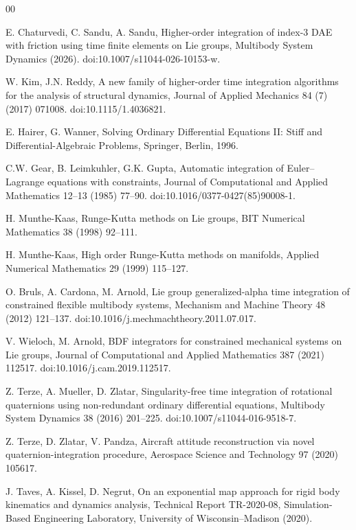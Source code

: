 \documentclass[preprint,12pt]{elsarticle}
\begin{document}
\begin{thebibliography}{00}

E. Chaturvedi, C. Sandu, A. Sandu,
Higher-order integration of index-3 DAE with friction using time finite
elements on Lie groups,
Multibody System Dynamics (2026).
doi:10.1007/s11044-026-10153-w.

W. Kim, J.N. Reddy,
A new family of higher-order time integration algorithms for the analysis of
structural dynamics,
Journal of Applied Mechanics 84 (7) (2017) 071008.
doi:10.1115/1.4036821.

E. Hairer, G. Wanner,
Solving Ordinary Differential Equations II: Stiff and Differential-Algebraic
Problems,
Springer, Berlin, 1996.

C.W. Gear, B. Leimkuhler, G.K. Gupta,
Automatic integration of Euler--Lagrange equations with constraints,
Journal of Computational and Applied Mathematics 12--13 (1985) 77--90.
doi:10.1016/0377-0427(85)90008-1.

H. Munthe-Kaas,
Runge-Kutta methods on Lie groups,
BIT Numerical Mathematics 38 (1998) 92--111.

H. Munthe-Kaas,
High order Runge-Kutta methods on manifolds,
Applied Numerical Mathematics 29 (1999) 115--127.

O. Bruls, A. Cardona, M. Arnold,
Lie group generalized-alpha time integration of constrained flexible
multibody systems,
Mechanism and Machine Theory 48 (2012) 121--137.
doi:10.1016/j.mechmachtheory.2011.07.017.

V. Wieloch, M. Arnold,
BDF integrators for constrained mechanical systems on Lie groups,
Journal of Computational and Applied Mathematics 387 (2021) 112517.
doi:10.1016/j.cam.2019.112517.

Z. Terze, A. Mueller, D. Zlatar,
Singularity-free time integration of rotational quaternions using
non-redundant ordinary differential equations,
Multibody System Dynamics 38 (2016) 201--225.
doi:10.1007/s11044-016-9518-7.

Z. Terze, D. Zlatar, V. Pandza,
Aircraft attitude reconstruction via novel quaternion-integration procedure,
Aerospace Science and Technology 97 (2020) 105617.

J. Taves, A. Kissel, D. Negrut,
On an exponential map approach for rigid body kinematics and dynamics
analysis,
Technical Report TR-2020-08, Simulation-Based Engineering Laboratory,
University of Wisconsin--Madison (2020).


\end{thebibliography}
\end{document}
